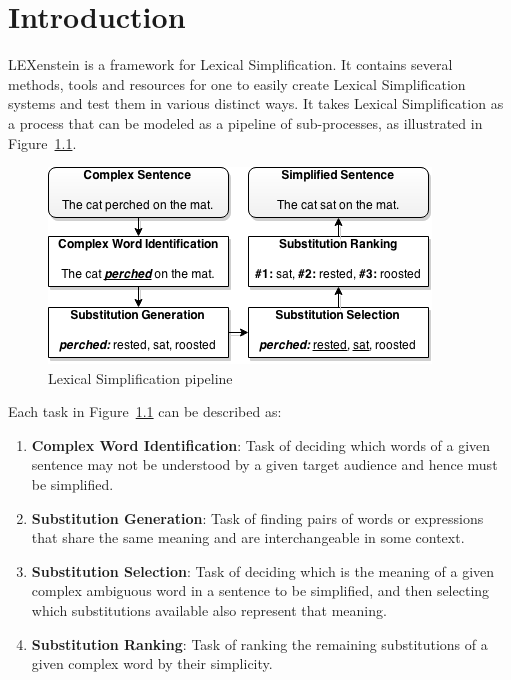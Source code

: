 \chapter{Introduction}

LEXenstein is a framework for Lexical Simplification. It contains several methods, tools and resources for one to easily create Lexical Simplification systems and test them in various distinct ways. It takes Lexical Simplification as a process that can be modeled as a pipeline of sub-processes, as illustrated in Figure~\ref{fig:exlepipe}.

\begin{figure}[htbp!] 
\centering    
\includegraphics[scale=0.8]{Figs/diagramshadow.png}
\caption{Lexical Simplification pipeline}
\label{fig:exlepipe}
\end{figure}

Each task in Figure~\ref{fig:exlepipe} can be described as:

\begin{enumerate}
\item \textbf{Complex Word Identification}: Task of deciding which words of a given sentence may not be understood by a given target audience and hence must be simplified.

\item \textbf{Substitution Generation}: Task of finding pairs of words or expressions that share the same meaning and are interchangeable in some context.

\item \textbf{Substitution Selection}: Task of deciding which is the meaning of a given complex ambiguous word in a sentence to be simplified, and then selecting which substitutions available also represent that meaning.

\item \textbf{Substitution Ranking}: Task of ranking the remaining substitutions of a given complex word by their simplicity.
\end{enumerate}

